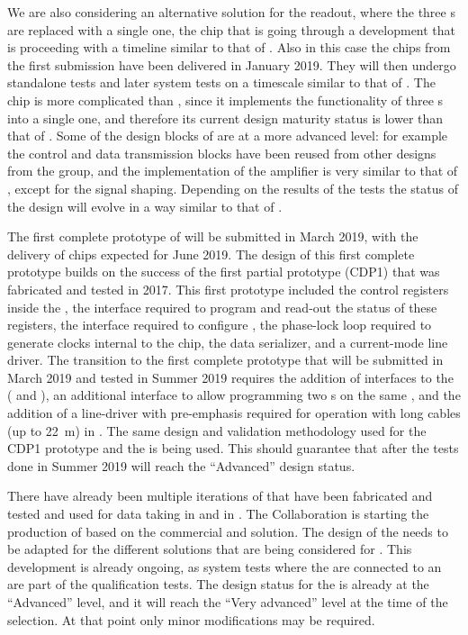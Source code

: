 We are also considering an alternative solution for the readout, where
the three s are replaced with a single one, the 
chip that is going through a development that is proceeding with a 
timeline similar to that of . Also in this case the
chips from the first submission have been delivered in January 2019.
They will then undergo standalone tests
and later system tests on a timescale similar to that of .
The  chip is more complicated than ,
since it implements the functionality of three s into a
single one, and therefore its current design maturity status is
lower than that of . Some of the design blocks of
 are at a more advanced level: for example the control
and data transmission blocks have been reused from other 
designs from the  group, and the implementation of the  amplifier
is very similar to that of , except for the signal 
shaping. Depending on the results of the tests the status of the
 design will evolve in a way similar to that of .

The first complete prototype of  will be submitted in 
March 2019, with the delivery of chips expected for June 2019.
The design of this first complete prototype builds on the success of
the first partial prototype (CDP1) that was fabricated and tested in 2017.
This first prototype included the control registers inside the 
, the  interface required to program and read-out
the status of these registers, the  interface required to
configure , the phase-lock loop required to generate
clocks internal to the chip, the data serializer, and a current-mode
line driver. The transition to the first complete prototype that
will be submitted in March 2019 and tested in Summer 2019
requires the addition of interfaces to the  (
and ), an additional  interface to allow programming two
 s on the same , and the
addition of a line-driver with pre-emphasis required for operation
with long cables (up to \SI{22}{m}) in \lar. The same design and
validation methodology used for the CDP1 prototype and the 
is being used. This should guarantee that after the tests done in
Summer 2019  will reach the ``Advanced'' design 
status. 

There have already been multiple iterations of  that
have been fabricated and tested and used for data taking in 
 and in . The  Collaboration
is starting the production of  based on the commercial  and
 solution. The design of the  needs to be adapted
for the different  solutions that are being considered
for . This development is already ongoing, as system tests 
where the  are connected to an  are part
of the qualification tests. The design status for the 
is already at the ``Advanced'' level, and it will reach the 
``Very advanced'' level at the time of the 
selection. At that point only minor modifications may be
required. 


